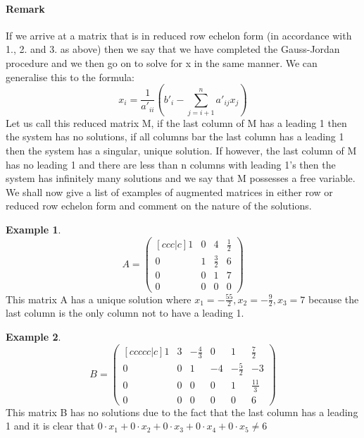 \documentclass[12pt,reqno,twoside,titlepage]{article}
\theoremstyle{definition}
\newtheorem{exmp}{Example}[section]
\begin{document}
\paragraph{Remark}
If we arrive at a matrix that is in reduced row echelon form (in accordance with 1., 2. and 3. as above) then we say that we have completed the Gauss-Jordan procedure and we then go on to solve for x in the same manner. We can generalise this to the formula:
\begin{equation*}
    x_{i} = \frac{1}{a'_{ii}}(b'_{i} - \sum_{j = i + 1}^{n} a'_{ij} x_{j})
\end{equation*}
\newline
Let us call this reduced matrix M, if the last column of M has a leading 1 then the system has no solutions, if all columns bar the last column has a leading 1 then the system has a singular, unique solution. If however, the last column of M has no leading 1 and there are less than n columns with leading 1’s then the system has infinitely many solutions and we say that M possesses a free variable.
\newline
We shall now give a list of examples of augmented matrices in either row or reduced row echelon form and comment on the nature of the solutions.
\begin{exmp}
\begin{equation*}
A =
    \begin{pmatrix}[ccc|c]
    1 & 0 & 4 & \frac{1}{2} \\
    0 & 1 & \frac{3}{2} & 6 \\
    0 & 0 & 1 & 7 \\
    0 & 0 & 0 & 0
    \end{pmatrix}
\end{equation*}
This matrix A has a unique solution where $x_{1} = -\frac{55}{2}, x_{2} = -\frac{9}{2}, x_{3} = 7$ because the last column is the only column not to have a leading 1.
\end{exmp}
\begin{exmp}
\begin{equation*}
    B =
    \begin{pmatrix}[ccccc|c]
    1 & 3 & -\frac{4}{3} & 0 & 1 & \frac{7}{2} \\
    0 & 0 & 1 & -4 & -\frac{5}{2} & -3 \\
    0 & 0 & 0 & 0 & 1 & \frac{11}{3} \\
    0 & 0 & 0 & 0 & 0 & 6
    \end{pmatrix}
\end{equation*}
This matrix B has no solutions due to the fact that the last column has a leading 1 and it is clear that $0\cdot x_{1} + 0\cdot x_{2} + 0\cdot x_{3} + 0\cdot x_{4} + 0\cdot x_{5} \ne 6$
\end{exmp}
\end{document}
